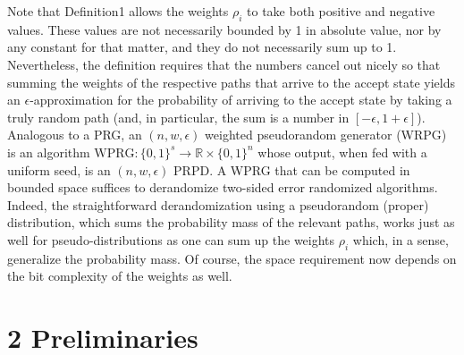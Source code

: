 Note that Definition1 allows the weights $\rho_i$ to take both positive and negative values. These values are not necessarily bounded by 1 in absolute value, nor by any constant for that matter, and they do not necessarily sum up to 1. Nevertheless, the definition requires that the numbers cancel out nicely so that summing the weights of the respective paths that arrive to the accept state yields an $\epsilon$-approximation for the probability of arriving to the accept state by taking a truly random path (and, in particular, the sum is a number in $[-\epsilon,1+\epsilon]$). Analogous to a PRG, an $(n,w,\epsilon)$ weighted pseudorandom generator (WRPG) is an algorithm $\mathrm{WPRG}:\{0,1\}^s\to\mathbb R\times\{0,1\}^n$ whose output, when fed with a uniform seed, is an $(n,w,\epsilon)$ PRPD.
A WPRG that can be computed in bounded space suffices to derandomize two-sided error randomized algorithms. Indeed, the straightforward derandomization using a pseudorandom (proper) distribution, which sums the probability mass of the relevant paths, works just as well for pseudo-distributions as one can sum up the weights $\rho_i$ which, in a sense, generalize the probability mass. Of course, the space requirement now depends on the bit complexity of the weights as well.
\section*{2 Preliminaries}

